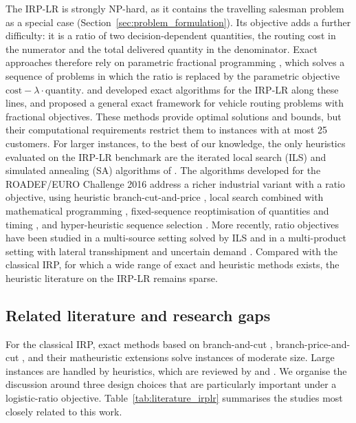 \documentclass{article}
\begin{document}
The IRP-LR is strongly NP-hard, as it contains the travelling salesman
problem as a special case (Section~\ref{sec:problem_formulation}). Its
objective adds a further difficulty: it is a ratio of two decision-dependent
quantities, the routing cost in the numerator and the total delivered
quantity in the denominator. Exact approaches therefore rely on parametric
fractional programming \citep{dinkelbach1967}, which solves a sequence of
problems in which the ratio is replaced by the parametric objective
$\text{cost} - \lambda \cdot \text{quantity}$. \citet{archetti2017logistic} and \citet{archetti2019exact}
developed exact algorithms for the IRP-LR along these lines, and
\citet{baldacci2020fractional} proposed a general exact framework for vehicle
routing problems with fractional objectives. These methods provide optimal
solutions and bounds, but their computational requirements restrict them to
instances with at most 25 customers. For larger instances, to the best of our
knowledge, the only heuristics evaluated on the IRP-LR benchmark are the
iterated local search (ILS) and simulated annealing (SA) algorithms of
\citet{alvarez2018iterated}. The algorithms developed for the ROADEF/EURO
Challenge 2016 address a richer industrial variant with a ratio objective,
using heuristic branch-cut-and-price \citep{absi2020branch}, local search
combined with mathematical programming \citep{su2020matheuristic},
fixed-sequence reoptimisation of quantities and timing
\citep{he2020fixedsequence}, and hyper-heuristic sequence selection
\citep{kheiri2020heuristic}. More recently, ratio objectives have been
studied in a multi-source setting solved by ILS \citep{alonsopecina2024iterated}
and in a multi-product setting with lateral transshipment and uncertain
demand \citep{man2025logistics}. Compared with the classical IRP, for which
a wide range of exact and heuristic methods exists, the heuristic literature
on the IRP-LR remains sparse.

\subsection{Related literature and research gaps}
\label{sec:intro_literature}

For the classical IRP, exact methods based on branch-and-cut
\citep{archetti2007branch,coelho2013branch}, branch-price-and-cut
\citep{desaulniers2016branch}, and their matheuristic extensions
\citep{skaalnes2023branch} solve instances of moderate size. Large instances
are handled by heuristics, which are reviewed by \citet{sofianopoulou2021review}
and \citet{ekcsi2026inventory}. We organise the discussion around three
design choices that are particularly important under a logistic-ratio
objective. Table~\ref{tab:literature_irplr} summarises the studies most
closely related to this work.
\end{document}
